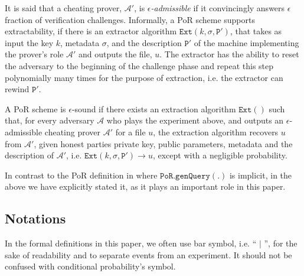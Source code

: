 It is said that a cheating prover, $\mathcal{A}'$, is \emph{$\epsilon$-admissible} if it convincingly answers $\epsilon$ fraction of verification challenges. Informally, a PoR scheme supports extractability, if there is an extractor algorithm $\mathtt{Ext}(k,\sigma, \mathtt{P}')$, that takes as input the key $k$, metadata $\sigma$, and the description $\mathtt{P}'$ of the  machine implementing the prover's role $\mathcal{A}'$ and outputs the file, $u$. The extractor has the ability to reset the adversary to the beginning of the challenge phase and repeat this step polynomially many times for the purpose of extraction, i.e. the extractor can rewind $\mathtt{P}'$.




\begin{definition}\label{extractable} A PoR scheme is $\epsilon$-sound if   there exists an extraction algorithm $\mathtt{Ext}()$ such that, for every adversary $\mathcal{A}$ who plays the experiment above, and outputs an $\epsilon$-admissible cheating prover $\mathcal{A}'$ for a file $u$,  the extraction algorithm  recovers $u$ from $\mathcal{A}'$, given honest parties private key, public parameters, metadata and the description of $\mathcal{A}'$,  i.e. $\mathtt{Ext}(k,\sigma, \mathtt{P}')\rightarrow u$, except with a negligible probability. 
\end{definition}








In contrast to the PoR definition in \cite{DBLP:journals/iacr/JuelsK07,DBLP:conf/asiacrypt/ShachamW08} where $\mathtt{PoR.genQuery}(.)$ is implicit, in the above we have explicitly stated  it, as it    plays an important role in this paper. 

\subsection{Notations} In the formal definitions in this paper, we often use bar symbol, i.e. `` $|$ '', for the sake of readability and to separate events from an experiment. It should not be confused with conditional probability's symbol. 


